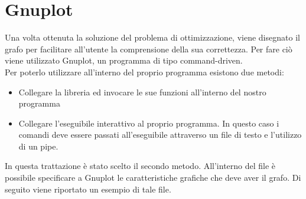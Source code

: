 \chapter{Gnuplot}\label{gnuplot}
Una volta ottenuta la soluzione del problema di ottimizzazione, viene disegnato il grafo per facilitare all'utente la comprensione della sua correttezza. Per fare ciò viene utilizzato Gnuplot, un programma di tipo command-driven.\\
Per poterlo utilizzare all'interno del proprio programma esistono due metodi:
\begin{itemize}
\item{Collegare la libreria ed invocare le sue funzioni all'interno del nostro programma}
\item{Collegare l'eseguibile interattivo al proprio programma. In questo caso i comandi deve essere passati all'eseguibile attraverso un file di testo e l'utilizzo di un pipe.}\\
\end{itemize}
In questa trattazione è stato scelto il secondo metodo. All'interno del file è possibile specificare a Gnuplot le caratteristiche grafiche che deve aver il grafo. Di seguito viene riportato un esempio di tale file.\\




